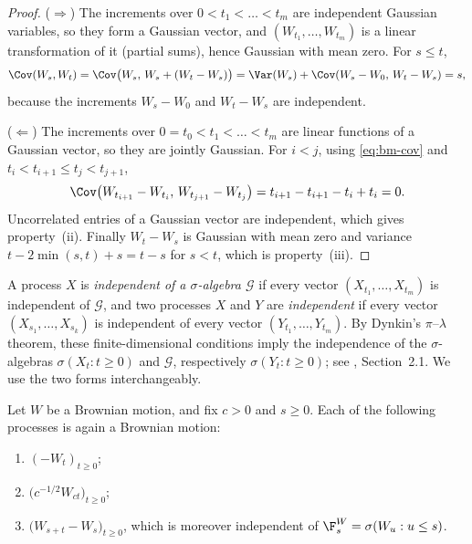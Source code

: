 \begin{proof}
($\Rightarrow$) The increments over $0<t_1<\dots<t_m$ are independent Gaussian variables,
so they form a Gaussian vector, and $(W_{t_1},\dots,W_{t_m})$ is a linear transformation
of it (partial sums), hence Gaussian with mean zero. For $s\le t$,
\[
  \Cov(W_s,W_t)=\Cov\big(W_s,\,W_s+(W_t-W_s)\big)=\Var(W_s)+\Cov(W_s-W_0,\,W_t-W_s)=s ,
\]
because the increments $W_s-W_0$ and $W_t-W_s$ are independent.

($\Leftarrow$) The increments over $0=t_0<t_1<\dots<t_m$ are linear functions of a
Gaussian vector, so they are jointly Gaussian. For $i<j$, using \eqref{eq:bm-cov} and
$t_i<t_{i+1}\le t_j<t_{j+1}$,
\[
  \Cov\big(W_{t_{i+1}}-W_{t_i},\,W_{t_{j+1}}-W_{t_j}\big)
  =t_{i+1}-t_{i+1}-t_i+t_i=0 .
\]
Uncorrelated entries of a Gaussian vector are independent, which gives property~(ii).
Finally $W_t-W_s$ is Gaussian with mean zero and variance $t-2\min(s,t)+s=t-s$ for $s<t$,
which is property~(iii).
\end{proof}

\begin{remark}\label{rem:bm-independence}
A process $X$ is \emph{independent of a $\sigma$-algebra $\mathcal G$} if every vector
$(X_{t_1},\dots,X_{t_m})$ is independent of $\mathcal G$, and two processes $X$ and $Y$ are
\emph{independent} if every vector $(X_{s_1},\dots,X_{s_k})$ is independent of every vector
$(Y_{t_1},\dots,Y_{t_m})$. By Dynkin's $\pi$--$\lambda$ theorem, these finite-dimensional
conditions imply the independence of the $\sigma$-algebras $\sigma(X_t:t\ge0)$ and
$\mathcal G$, respectively $\sigma(Y_t:t\ge0)$; see \textcite{durrett}, Section~2.1. We
use the two forms interchangeably.
\end{remark}

\begin{proposition}\label{prop:bm-invariance}
Let $W$ be a Brownian motion, and fix $c>0$ and $s\ge0$. Each of the following processes
is again a Brownian motion:
\begin{enumerate}[label=(\alph*)]
  \item $(-W_t)_{t\ge0}$;
  \item $\big(c^{-1/2}W_{ct}\big)_{t\ge0}$;
  \item $\big(W_{s+t}-W_s\big)_{t\ge0}$, which is moreover independent of
    $\F^W_s=\sigma(W_u:u\le s)$.
\end{enumerate}
\end{proposition}

